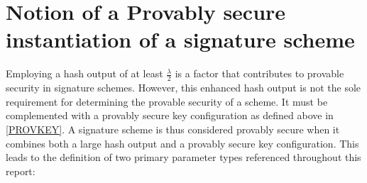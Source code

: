 \documentclass[]{final_report}
\theoremstyle{definition}
\begin{document}

\section{Notion of a Provably secure instantiation of a signature scheme}
\label{sec:ProvablySecureInstantiation}


Employing a hash output of at least \(\frac{\lambda}{2}\) is a factor that contributes to provable security in signature schemes. However, this enhanced hash output is not the sole requirement for determining the provable security of a scheme. It must be complemented with a provably secure key configuration as defined above in \ref{PROVKEY}. A signature scheme is thus considered provably secure when it combines both a large hash output and a provably secure key configuration. This leads to the definition of two primary parameter types referenced throughout this report:
\end{document}
